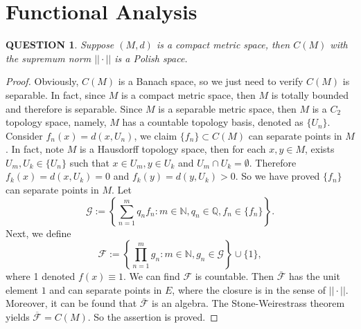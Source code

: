 \documentclass[12pt]{article}
\renewcommand{\(}{\left(}%
\renewcommand{\)}{\right)}%
\renewcommand{\[}{\left[}%
\renewcommand{\]}{\right]}%
\newcommand{\q}{\mathbb{Q}}
\newcommand{\n}{\mathbb{N}}
\newcommand{\f}{\mathscr{F}}
\newcommand{\g}{\mathscr{G}}
\newtheorem{question}{QUESTION}[section]}
\newtheorem{proof}{Proof.}}
\begin{document}
  \section{Functional Analysis}
  \begin{question}
   Suppose $(M,d)$ is a compact metric space, then $C(M)$ with the supremum norm $||\cdot||$ is a Polish space.
  \end{question}
  \begin{proof}
   Obviously, $C(M)$ is a Banach space, so we just need to verify $C(M)$ is separable. In fact, since $M$ is a compact metric space, then $M$ is totally bounded and therefore is separable. Since $M$ is a separable metric space, then $M$ is a $C_2$ topology space, namely, $M$ has a countable topology basis, denoted as $\{U_n\}$. Consider $f_n(x)=d(x,U_n)$, we claim $\{f_n\}\subset C(M)$ can separate points in $M$. In fact, note $M$ is a Hausdorff topology space, then for each $x,y\in M$, exists $U_m,U_k\in\{U_n\}$ such that $x\in U_m,y\in U_k$ and $U_m\cap U_k=\emptyset$. Therefore $f_k(x)=d(x,U_k)=0$ and $f_k(y)=d(y,U_k)>0$. So we have proved $\{f_n\}$ can separate points in $M$. Let 
   \begin{equation*}
   	\g:=\left\{\sum_{n=1}^m q_nf_n:m\in\n,q_n\in\q,f_n\in\{f_n\} \right\}.
   \end{equation*}
   Next, we define
   \begin{equation*}
   	\f:=\left\{\prod_{n=1}^m g_n:m\in\n,g_n\in\g \right\}\cup\{1\},
   \end{equation*}
   where 1 denoted $f(x)\equiv 1$. We can find $\f$ is countable. Then $\bar{\f}$ has the unit element $1$ and can separate points in $E$, where the closure is in the sense of $||\cdot||$. Moreover, it can be found that $\bar{\f}$ is an algebra. The {\sffamily Stone-Weirestrass theorem} yields $\overline{\f}=C(M)$. So the assertion is proved.
  \end{proof}
\end{document}
